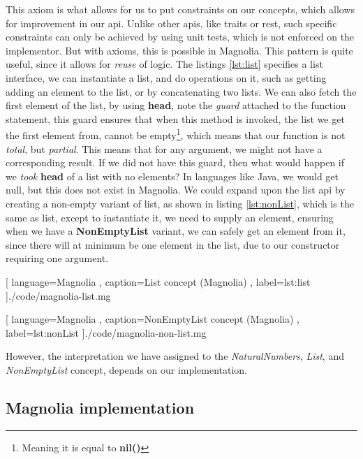 This axiom is what allows for us to put constraints on our concepts, which
allows for improvement in our \gls*{api}. Unlike other \gls*{api}s, like traits or
\gls*{rest}, such specific constraints can only be achieved by using unit tests,
which is not enforced on the implementor. But with axioms, this is possible in
Magnolia. This pattern is quite useful, since it allows for \textit{reuse} of
logic. The listings \ref{lst:list} specifies a list interface, we can
instantiate a list, and do operations on it, such as getting adding an element to
the list, or by concatenating two lists. We can also fetch the first element of
the list, by using \textbf{head}, note the \textit{guard} attached to the
function statement, this guard ensures that when this method is invoked, the
list we get the first element from, cannot be empty\footnote{Meaning it is equal to \textbf{nil()}},
which means that our function is not \textit{total}, but \textit{partial}. This
means that for any argument, we might not have a corresponding result. If we did
not have this guard, then what would happen if we \textit{took} \textbf{head} of a list
with no elements? In languages like Java, we would get null, but this does not
exist in Magnolia. We could expand upon the list \gls*{api} by creating a
non-empty variant of list, as shown in listing \ref{lst:nonList}, which is the
same as list, except to instantiate it, we need to supply an element, ensuring
when we have a \textbf{NonEmptyList} variant, we can safely get an element from
it, since there will at minimum be one element in the list, due to our
constructor requiring one argument.

\begin{code}[H]
  
    [ language=Magnolia
    , caption={List concept (Magnolia)}
    , label=lst:list
    ]{./code/magnolia-list.mg}
\end{code}

\begin{code}[H]
  
    [ language=Magnolia
    , caption={NonEmptyList concept (Magnolia)}
    , label=lst:nonList
    ]{./code/magnolia-non-list.mg}
\end{code}

However, the interpretation we have assigned to the \textit{NaturalNumbers},
\textit{List}, and \textit{NonEmptyList} concept, depends on our implementation.

\subsection{Magnolia implementation}

